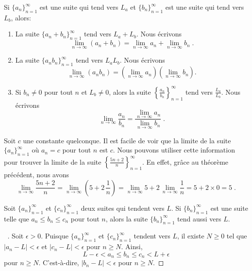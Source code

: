 {\begin{theorem} \label{suite3}
Si $\displaystyle \{ a_n\}_{n=1}^\infty$ est une suite qui tend vers
$L_a$ et $\displaystyle \{ b_n\}_{n=1}^\infty$ est une suite qui tend
vers $L_b$, alors:
\begin{enumerate}
\item La suite $\displaystyle \{ a_n + b_n \}_{n=1}^\infty$ tend vers
$L_a + L_b$.  Nous écrivons
\[
\lim_{n\rightarrow \infty} (a_n + b_n) =
\lim_{n\rightarrow \infty} a_n + \lim_{n\rightarrow \infty} b_n \; .
\]
\item La suite $\displaystyle \{ a_n b_n \}_{n=1}^\infty$ tend vers
$L_a L_b$.  Nous écrivons
\[
\lim_{n\rightarrow \infty} (a_n b_n) =
\left(\lim_{n\rightarrow \infty} a_n \right)
\left(\lim_{n\rightarrow \infty} b_n \right) .
\]
\item Si $b_n \neq 0$ pour tout $n$ et $L_b\neq 0$, alors la suite
$\displaystyle \left\{ \frac{a_n}{b_n} \right\}_{n=1}^\infty$
tend vers $\displaystyle \frac{L_a}{L_b}$.  Nous écrivons
\[
\lim_{n\rightarrow \infty} \frac{a_n}{b_n} =
\frac{\displaystyle \lim_{n\rightarrow \infty} a_n}
{\displaystyle \lim_{n\rightarrow \infty} b_n} \; .
\]
\end{enumerate}
\end{theorem}

\begin{egg}
Soit $c$ une constante quelconque.  Il est facile de voir que la
limite de la suite $\displaystyle \{ a_n\}_{n=1}^\infty$ où $a_n = c$
pour tout $n$ est $c$.  Nous pouvons utiliser cette information pour
trouver la limite de la suite
$\displaystyle \left\{ \frac{5n+2}{n} \right\}_{n=1}^\infty$.  En
effet, grâce au théorème précédent, nous avons
\[
\lim_{n\rightarrow \infty} \frac{5n+2}{n}
= \lim_{n\rightarrow \infty} \left(5 + 2\,\frac{1}{n} \right)
= \lim_{n\rightarrow \infty} 5 + 2\,\lim_{n\rightarrow \infty}\frac{1}{n}
= 5 + 2 \times 0 = 5 \; .
\]
\end{egg}

\begin{theorem} \label{gendarmeS}
 
Soit
$\displaystyle \{ a_n\}_{n=1}^\infty$ et $\displaystyle \{c_n\}_{n=1}^\infty$
deux suites qui tendent vers $L$.  Si
$\displaystyle \{ b_n\}_{n=1}^\infty$ est une suite telle que 
$a_n \leq b_n \leq c_n$ pour tout $n$, alors la
suite $\displaystyle \{ b_n\}_{n=1}^\infty$ tend aussi vers $L$.
\end{theorem}

\begin{proof}[\UOproof\ \theory]
Soit $\epsilon>0$.  Puisque $\displaystyle \{ a_n\}_{n=1}^\infty$ et
$\displaystyle \{c_n\}_{n=1}^\infty$ tendent vers $L$, il existe $N\geq 0$
tel que $|a_n-L|<\epsilon$ et $|c_n - L|<\epsilon$ pour $n\geq N$.  Ainsi,
\[
L-\epsilon < a_n \leq b_n \leq c_n < L+\epsilon
\]
pour $n\geq N$.  C'est-à-dire, $|b_n-L|<\epsilon$ pour $n\geq N$.
\end{proof}

}
